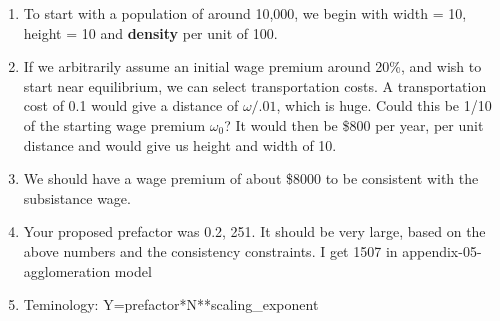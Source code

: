 
\begin{enumerate}
\item To start with a population of around 10,000, we begin with width = 10, height = 10 and \textbf{density} per unit of 100. 

\item If we arbitrarily assume an initial wage premium around 20\%, and wish to start near equilibrium, %
we can select transportation costs. A transportation cost of 0.1  would give a distance of $\omega/.01$, which is huge. Could this be 1/10 of the starting wage premium $\omega_0$? It would then be \$800 per year, per unit distance and would give us height and width of 10. 
\item We should have a wage premium of about \$8000 to be consistent with the subsistance wage. %

\item Your proposed prefactor was 0.2,  251. It should be very large, based on the above numbers and the consistency constraints. I get 1507 in appendix-05-agglomeration model

\item Teminology: Y=prefactor*N**scaling\_exponent

\end{enumerate}

